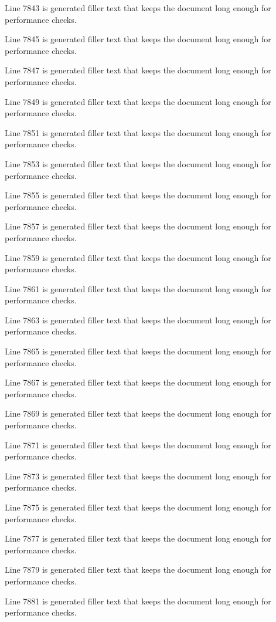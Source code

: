 Line 7843 is generated filler text that keeps the document long enough for performance checks.

Line 7845 is generated filler text that keeps the document long enough for performance checks.

Line 7847 is generated filler text that keeps the document long enough for performance checks.

Line 7849 is generated filler text that keeps the document long enough for performance checks.

Line 7851 is generated filler text that keeps the document long enough for performance checks.

Line 7853 is generated filler text that keeps the document long enough for performance checks.

Line 7855 is generated filler text that keeps the document long enough for performance checks.

Line 7857 is generated filler text that keeps the document long enough for performance checks.

Line 7859 is generated filler text that keeps the document long enough for performance checks.

Line 7861 is generated filler text that keeps the document long enough for performance checks.

Line 7863 is generated filler text that keeps the document long enough for performance checks.

Line 7865 is generated filler text that keeps the document long enough for performance checks.

Line 7867 is generated filler text that keeps the document long enough for performance checks.

Line 7869 is generated filler text that keeps the document long enough for performance checks.

Line 7871 is generated filler text that keeps the document long enough for performance checks.

Line 7873 is generated filler text that keeps the document long enough for performance checks.

Line 7875 is generated filler text that keeps the document long enough for performance checks.

Line 7877 is generated filler text that keeps the document long enough for performance checks.

Line 7879 is generated filler text that keeps the document long enough for performance checks.

Line 7881 is generated filler text that keeps the document long enough for performance checks.

